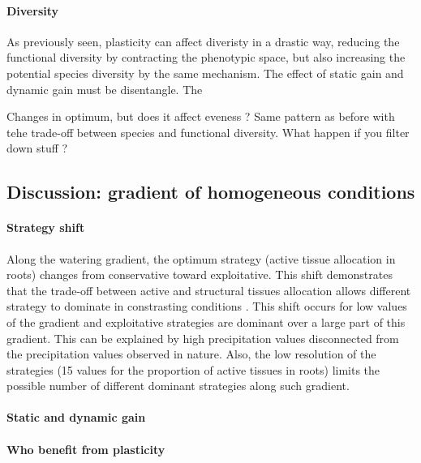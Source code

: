 \paragraph{Diversity}

As previously seen, plasticity can affect diveristy in a drastic way, reducing the functional diversity by contracting the phenotypic space, but also increasing the potential species diversity by the same mechanism. The effect of static gain and dynamic gain must be disentangle. The 



Changes in optimum, but does it affect eveness ? Same pattern as before with tehe trade-off between species and functional diversity. What happen if you filter down stuff ?



\subsection{Discussion: gradient of homogeneous conditions}

\paragraph{Strategy shift}
Along the watering gradient, the optimum strategy (active tissue allocation in roots) changes from conservative toward exploitative. This shift demonstrates that the trade-off between active and structural tissues allocation allows different strategy to dominate in constrasting conditions \parencite{}. This shift occurs for low values of the gradient and exploitative strategies are dominant over a large part of this gradient. This can be explained by high precipitation values disconnected from the precipitation values observed in nature. Also, the low resolution of the strategies (15 values for the proportion of active tissues in roots) limits the possible number of different dominant strategies along such gradient. 

\paragraph{Static and dynamic gain}
\paragraph{Who benefit from plasticity}

